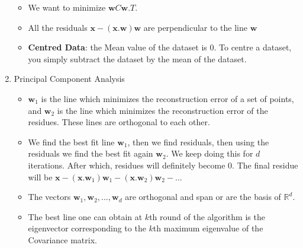 \documentclass[a4paper]{article}
\begin{document}
\begin{enumerate}
\begin{itemize}
        \item We want to minimize $\textbf{w}C\textbf{w}.T$.
        \item All the residuals $\textbf{x} - (\textbf{x.w})\textbf{w}$ are perpendicular to the line $\textbf{w}$
        \item \textbf{Centred Data}: the Mean value of the dataset is 0. To centre a dataset, you simply subtract the dataset by the mean of the dataset.
    \end{itemize}
    \item{Principal Component Analysis}
    \begin{itemize}
        \item $\textbf{w}_1$ is the line which minimizes the reconstruction error of a set of points, and $\textbf{w}_2$ is the line which minimizes the reconstruction error of the residues. These lines are orthogonal to each other.
        \item We find the best fit line $\textbf{w}_1$, then we find residuals, then using the residuals we find the best fit again $\textbf{w}_2$. We keep doing this for $d$ iterations. After which, residues will definitely become 0. The final residue will be $\textbf{x} - (\textbf{x.w}_1)\textbf{w}_1 - (\textbf{x.w}_2)\textbf{w}_2 - ...$
        \item The vectors $\textbf{w}_1,\textbf{w}_2,...,\textbf{w}_d$ are orthogonal and span or are the basis of $\mathbb{R}^d$.
        \item The best line one can obtain at $k$th round of the algorithm is the eigenvector corresponding to the $k$th maximum eigenvalue of the Covariance matrix.
    \end{itemize}
\end{enumerate}
\end{document}
